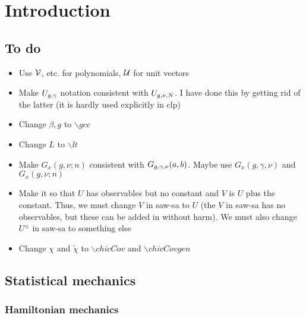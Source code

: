 
\chapter{Introduction}

\section{To do}
\begin{itemize}
\item
Use $\mathcal{V}$, etc. for polynomials, $\mathcal{U}$ for unit vectors

\item
Make $U_{g,\gamma}$ notation consistent with $U_{g,\nu,N}$.
I have done this by getting rid of the latter (it is hardly used
explicitly in clp)

\item
Change $\beta, g$ to $\backslash gcc$

\item
Change $L$ to $\backslash lt$

\item
Make $G_x(g, \nu; n)$ consistent with $G_{g,\gamma,\nu}(a, b)$.
Maybe use $G_x(g, \gamma, \nu)$ and $G_x(g, \nu; n)$

\item
Make it so that $U$ has observables but no constant and $V$ is $U$
plus the constant. Thus, we must change $V$ in saw-sa to $U$ (the $V$
in saw-sa has no observables, but these can be added in without harm).
We must also change $U^\pm$ in saw-sa to something else

\item
Change $\chi$ and $\tilde\chi$ to $\backslash chicCov$ and $\backslash chicCovgen$
\end{itemize}


\section{Statistical mechanics}


\subsection{Hamiltonian mechanics}

